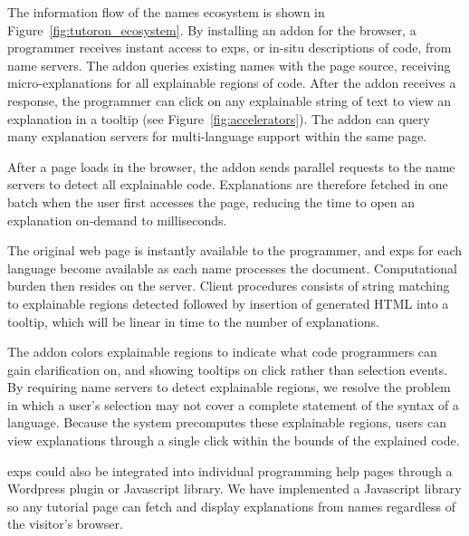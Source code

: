 The information flow of the \Glspl{name} ecosystem is shown in Figure~\ref{fig:tutoron_ecosystem}.
By installing an addon for the browser, a programmer receives instant access to \glspl{exp}, or in-situ descriptions of code, from \Gls{name} servers.
The addon queries existing \Glspl{name} with the page source, receiving micro-explanations for all explainable regions of code.
After the addon receives a response, the programmer can click on any explainable string of text to view an explanation in a tooltip (see Figure~\ref{fig:accelerators}).
The addon can query many explanation servers for multi-language support within the same page.


\begin{changes}
After a page loads in the browser, the addon sends parallel requests to the \Gls{name} servers to detect all explainable code.
Explanations are therefore fetched in one batch when the user first accesses the page, reducing the time to open an explanation on-demand to milliseconds.
\end{changes}
The original web page is instantly available to the programmer, and \glspl{exp} for each language become available as each \Gls{name} processes the document.
Computational burden then resides on the server.
 Client procedures consists of string matching to explainable regions detected followed by insertion of generated HTML into a tooltip, which will be linear in time to the number of explanations.\fi

\begin{changes}
The addon colors explainable regions to indicate what code programmers can gain clarification on, and showing tooltips on click rather than selection events.
By requiring \Gls{name} servers to detect explainable regions, we resolve the problem in which a user's selection may not cover a complete statement of the syntax of a language.
Because the system precomputes these explainable regions, users can view explanations through a single click within the bounds of the explained code.
\end{changes}
  \fi

\begin{changes}
\Glspl{exp} could also be integrated into individual programming help pages through a Wordpress plugin or Javascript library.
We have implemented a Javascript library so any tutorial page can fetch and display explanations from \Glspl{name} regardless of the visitor's browser.
\end{changes}

